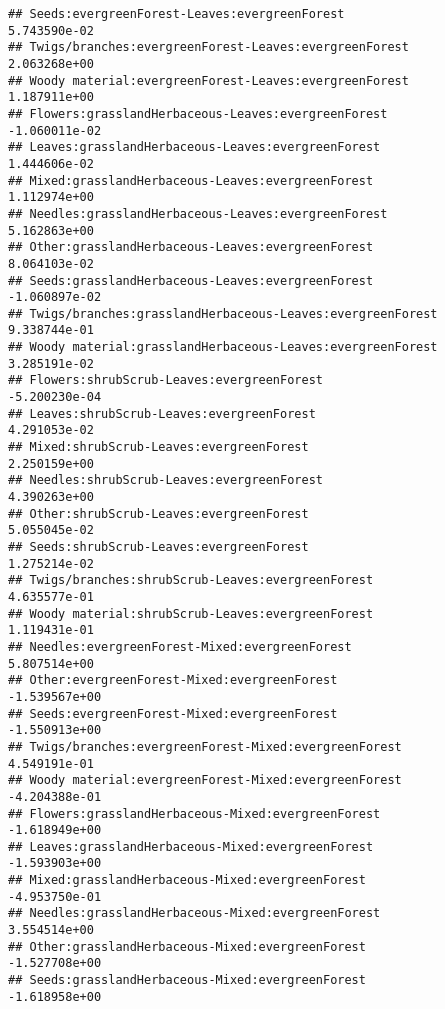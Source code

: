 \documentclass[
]{article}
\begin{document}
\begin{verbatim}
## Seeds:evergreenForest-Leaves:evergreenForest                           5.743590e-02
## Twigs/branches:evergreenForest-Leaves:evergreenForest                  2.063268e+00
## Woody material:evergreenForest-Leaves:evergreenForest                  1.187911e+00
## Flowers:grasslandHerbaceous-Leaves:evergreenForest                    -1.060011e-02
## Leaves:grasslandHerbaceous-Leaves:evergreenForest                      1.444606e-02
## Mixed:grasslandHerbaceous-Leaves:evergreenForest                       1.112974e+00
## Needles:grasslandHerbaceous-Leaves:evergreenForest                     5.162863e+00
## Other:grasslandHerbaceous-Leaves:evergreenForest                       8.064103e-02
## Seeds:grasslandHerbaceous-Leaves:evergreenForest                      -1.060897e-02
## Twigs/branches:grasslandHerbaceous-Leaves:evergreenForest              9.338744e-01
## Woody material:grasslandHerbaceous-Leaves:evergreenForest              3.285191e-02
## Flowers:shrubScrub-Leaves:evergreenForest                             -5.200230e-04
## Leaves:shrubScrub-Leaves:evergreenForest                               4.291053e-02
## Mixed:shrubScrub-Leaves:evergreenForest                                2.250159e+00
## Needles:shrubScrub-Leaves:evergreenForest                              4.390263e+00
## Other:shrubScrub-Leaves:evergreenForest                                5.055045e-02
## Seeds:shrubScrub-Leaves:evergreenForest                                1.275214e-02
## Twigs/branches:shrubScrub-Leaves:evergreenForest                       4.635577e-01
## Woody material:shrubScrub-Leaves:evergreenForest                       1.119431e-01
## Needles:evergreenForest-Mixed:evergreenForest                          5.807514e+00
## Other:evergreenForest-Mixed:evergreenForest                           -1.539567e+00
## Seeds:evergreenForest-Mixed:evergreenForest                           -1.550913e+00
## Twigs/branches:evergreenForest-Mixed:evergreenForest                   4.549191e-01
## Woody material:evergreenForest-Mixed:evergreenForest                  -4.204388e-01
## Flowers:grasslandHerbaceous-Mixed:evergreenForest                     -1.618949e+00
## Leaves:grasslandHerbaceous-Mixed:evergreenForest                      -1.593903e+00
## Mixed:grasslandHerbaceous-Mixed:evergreenForest                       -4.953750e-01
## Needles:grasslandHerbaceous-Mixed:evergreenForest                      3.554514e+00
## Other:grasslandHerbaceous-Mixed:evergreenForest                       -1.527708e+00
## Seeds:grasslandHerbaceous-Mixed:evergreenForest                       -1.618958e+00

\end{verbatim}
\end{document}
